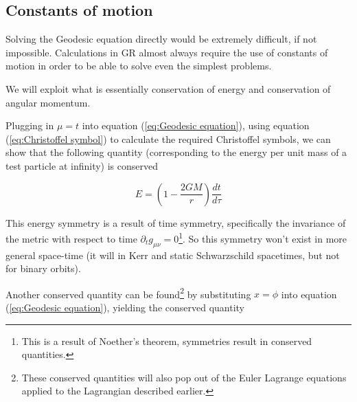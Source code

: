





\subsection{Constants of motion}
Solving the Geodesic equation directly would be extremely difficult, if not impossible. Calculations in GR almost always require the use of constants of motion in order to be able to solve even the simplest problems.

We will exploit what is essentially conservation of energy and conservation of angular momentum.

Plugging in $\mu=t$ into equation (\ref{eq:Geodesic equation}), using equation (\ref{eq:Christoffel symbol}) to calculate the required Christoffel symbols, we can show that the following quantity (corresponding to the energy per unit mass of a test particle at infinity) is conserved

\begin{equation}
    E = (1-\frac{2 G M}{r}) \frac{dt}{d\tau}
\label{eq:Energy conservation}
\end{equation}

This energy symmetry is a result of time symmetry, specifically the invariance of the metric with respect to time $\partial_t g_{\mu \nu} = 0$\footnote{This is a result of Noether's theorem, symmetries result in conserved quantities.}. So this symmetry won't exist in more general space-time (it will in Kerr and static Schwarzschild spacetimes, but not for binary orbits).

Another conserved quantity can be found\footnote{These conserved quantities will also pop out of the Euler Lagrange equations applied to the Lagrangian described earlier.} by substituting $x=\phi$ into equation (\ref{eq:Geodesic equation}), yielding the conserved quantity

